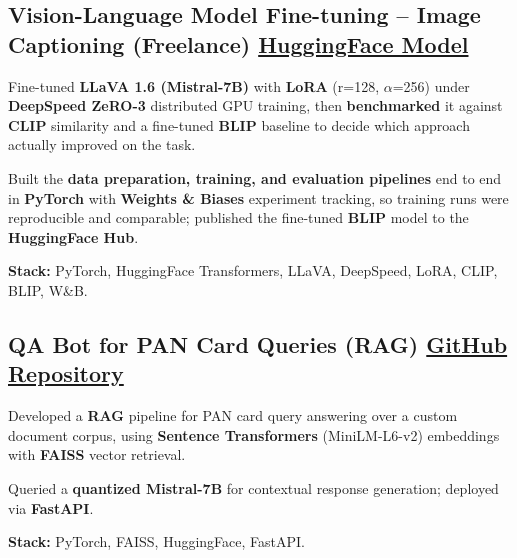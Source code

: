 \documentclass[letter,10pt]{article}
\begin{document}
\subsection{Vision-Language Model Fine-tuning – Image Captioning (Freelance) \hfill \href{https://huggingface.co/sunil448832/blip-model}{HuggingFace Model}}
\begin{zitemize}
\item Fine-tuned \textbf{LLaVA 1.6 (Mistral-7B)} with \textbf{LoRA} (r=128, $\alpha$=256) under \textbf{DeepSpeed ZeRO-3} distributed GPU training, then \textbf{benchmarked} it against \textbf{CLIP} similarity and a fine-tuned \textbf{BLIP} baseline to decide which approach actually improved on the task.
\item Built the \textbf{data preparation, training, and evaluation pipelines} end to end in \textbf{PyTorch} with \textbf{Weights \& Biases} experiment tracking, so training runs were reproducible and comparable; published the fine-tuned \textbf{BLIP} model to the \textbf{HuggingFace Hub}.
\item \textbf{Stack:} PyTorch, HuggingFace Transformers, LLaVA, DeepSpeed, LoRA, CLIP, BLIP, W\&B.
\end{zitemize}

\subsection{QA Bot for PAN Card Queries (RAG) \hfill \href{https://github.com/sunil448832/Natural-Language-Processing/tree/master/RAG(Retrieval\%20Augment\%20Generation)}{GitHub Repository}}
\begin{zitemize}
\item Developed a \textbf{RAG} pipeline for PAN card query answering over a custom document corpus, using \textbf{Sentence Transformers} (MiniLM-L6-v2) embeddings with \textbf{FAISS} vector retrieval.
\item Queried a \textbf{quantized Mistral-7B} for contextual response generation; deployed via \textbf{FastAPI}.
\item \textbf{Stack:} PyTorch, FAISS, HuggingFace, FastAPI.
\end{zitemize}
\end{document}
